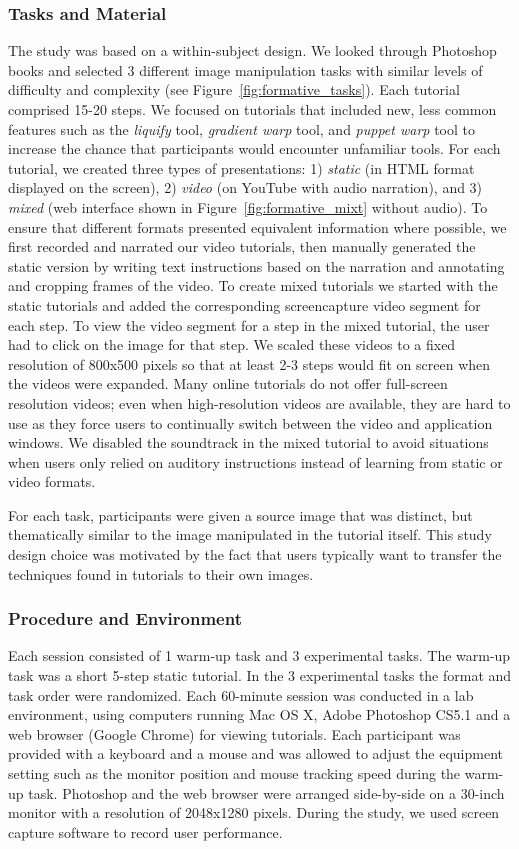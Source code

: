 \subsubsection{Tasks and Material}
The study was based on a within-subject design. We looked through Photoshop books and selected 3 different image manipulation tasks with similar levels of difficulty and complexity (see Figure~\ref{fig:formative_tasks}). Each tutorial comprised 15-20 steps. We focused on tutorials that included new, less common features such as the \emph{liquify} tool, \emph{gradient warp} tool, and \emph{puppet warp} tool to increase the chance that participants would encounter unfamiliar tools. For each tutorial, we created three types of presentations: 1) \emph{static} (in HTML format displayed on the screen), 2) \emph{video} (on YouTube with audio narration), and 3) \emph{mixed} (web interface shown in Figure~\ref{fig:formative_mixt} without audio). To ensure that different formats presented equivalent information where possible, we first recorded and narrated our video tutorials, then manually generated the static version by writing text instructions based on the narration and annotating and cropping frames of the video. To create mixed tutorials we started with the static tutorials and added the corresponding screencapture video segment for each step. To view the video segment for a step in the mixed tutorial, the user had to click on the image for that step. We scaled these videos to a fixed resolution of 800x500 pixels so that at least 2-3 steps would fit on screen when the videos were expanded. Many online tutorials do not offer full-screen resolution videos; even when high-resolution videos are available, they are hard to use as they force users to continually switch between the video and application windows. We disabled the soundtrack in the mixed tutorial to avoid situations when users only relied on auditory instructions instead of learning from static or video formats.

For each task, participants were given a source image that was distinct, but thematically similar to the image manipulated in the tutorial itself. This study design choice was motivated by the fact that users typically want to transfer the techniques found in tutorials to their own images.

\subsubsection{Procedure and Environment}
Each session consisted of 1 warm-up task and 3 experimental tasks. The warm-up task was a short 5-step static tutorial. In the 3 experimental tasks the format and task order were randomized. Each 60-minute session was conducted in a lab environment, using computers running Mac OS X, Adobe Photoshop CS5.1 and a web browser (Google Chrome) for viewing tutorials. Each participant was provided with a keyboard and a mouse and was allowed to adjust the equipment setting such as the monitor position and mouse tracking speed during the warm-up task. Photoshop and the web browser were arranged side-by-side on a 30-inch monitor with a resolution of 2048x1280 pixels. During the study, we used screen capture software to record user performance.

